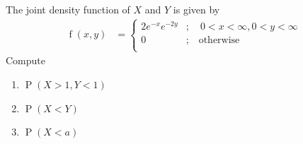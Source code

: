 \documentclass[titlepage, fleqn, a4paper, 12pt, twoside]{article}
\theoremstyle{definition}
\theoremstyle{theorem}
\DeclareMathOperator{\prob}{\mathrm{P}}
\DeclareMathOperator{\pdf}{\mathrm{f}}
\begin{document}
\begin{question}
	The joint density function of $X$ and $Y$ is given by
	\begin{align*}
		\pdf(x,y) &=
			\begin{cases}
				2 e^{-x} e^{-2 y} & ;\quad 0 < x < \infty , 0 < y < \infty \\
				0                 & ;\quad \text{otherwise}                \\
			\end{cases}
	\end{align*}
	Compute
	\begin{enumerate}
		\item $\prob(X > 1 , Y < 1)$
		\item $\prob(X < Y)$
		\item $\prob(X < a)$
	\end{enumerate}
\end{question}
\end{document}
